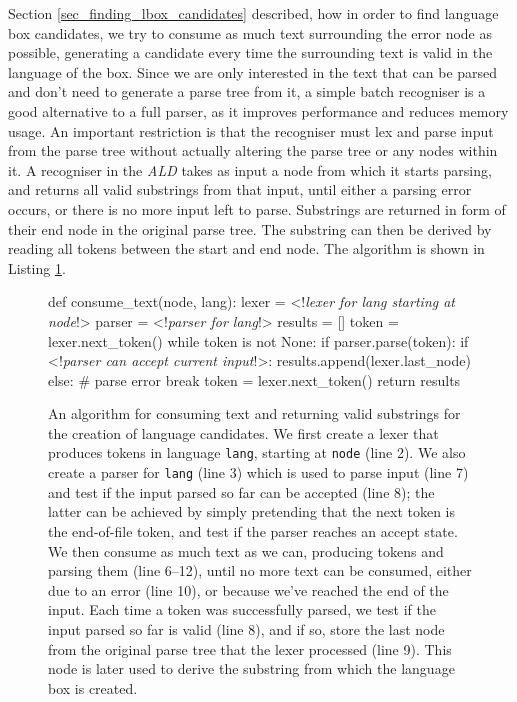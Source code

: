 \documentclass[sigplan,screen]{acmart}\settopmatter{printfolios=true,printccs=false,printacmref=false}
\newcommand{\ald}[0]{\emph{ALD}\xspace}
\begin{document}
Section \ref{sec_finding_lbox_candidates} described, how in order to find
language box candidates, we try to consume as much text surrounding the error
node as possible, generating a candidate every time the surrounding text is
valid in the language of the box. Since we are only interested in the text that
can be parsed and don't need to generate a parse tree from it, a simple batch
recogniser is a good alternative to a full parser, as it improves performance
and reduces memory usage.  An important restriction is that the recogniser must
lex and parse input from the parse tree without actually altering the parse
tree or any nodes within it.  A recogniser in the \ald takes as input a node
from which it starts parsing, and returns all valid substrings from that input,
until either a parsing error occurs, or there is no more input left to parse.
Substrings are returned in form of their end node in the original parse tree.
The substring can then be derived by reading all tokens between the start and
end node.  The algorithm is shown in Listing \ref{lst_consume_text}.

\begin{figure}
\begin{lstdefault}[]
def consume_text(node, lang):
  lexer = <!\textit{lexer for lang starting at node}!>
  parser = <!\textit{parser for lang}!>
  results = []
  token = lexer.next_token()
  while token is not None:
    if parser.parse(token):
      if <!\textit{parser can accept current input}!>:
        results.append(lexer.last_node)
    else: # parse error
      break
    token = lexer.next_token()
  return results
\end{lstdefault}
\caption{An algorithm for consuming text and returning valid
substrings for the creation of language candidates. We first create a lexer that
produces tokens in language \texttt{lang}, starting at \texttt{node} (line 2).
We also create a parser for \texttt{lang} (line 3) which is used to parse input (line 7) and test if the
input parsed so far can be accepted (line 8); the latter can be achieved by simply pretending
that the next token is the end-of-file token, and test if the
parser reaches an accept state. We then consume as much text as we can,
producing tokens and parsing them (line 6--12), until no more text can be
consumed, either due to an error (line 10), or because we've reached the end of
the input. Each time a token was successfully parsed, we test if the input parsed so far is
valid (line 8), and if so, store the last node from the original parse tree that the lexer
processed (line 9). This node is later used to derive the substring from which the
language box is created.}
\label{lst_consume_text}
\end{figure}
\end{document}

